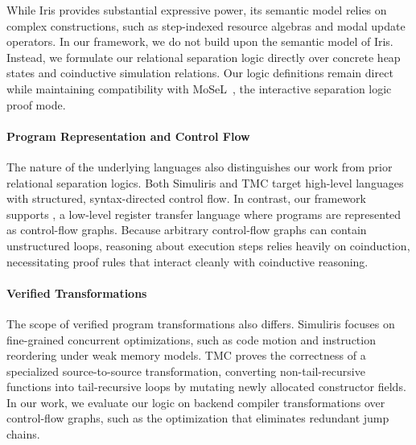 \documentclass[report.tex]{subfiles}
\begin{document}
While Iris provides substantial expressive power,
its semantic model relies on complex constructions,
such as step-indexed resource algebras and modal update operators.
In our framework,
we do not build upon the semantic model of Iris.
Instead,
we formulate our relational separation logic directly
over concrete heap states and coinductive simulation relations.
Our logic definitions remain direct while maintaining compatibility
with MoSeL~\parencite{krebbers-18-mosel},
the interactive separation logic proof mode.

\paragraph{Program Representation and Control Flow}
The nature of the underlying languages also distinguishes
our work from prior relational separation logics.
Both Simuliris and TMC target high-level languages
with structured,
syntax-directed control flow.
In contrast,
our framework supports \muRTL{},
a low-level register transfer language
where programs are represented as control-flow graphs.
Because arbitrary control-flow graphs can contain unstructured loops,
reasoning about execution steps relies heavily on coinduction,
necessitating proof rules that interact cleanly with coinductive reasoning.

\paragraph{Verified Transformations}
The scope of verified program transformations also differs.
Simuliris focuses on fine-grained concurrent optimizations,
such as code motion and instruction reordering under weak memory models.
TMC proves the correctness of a specialized source-to-source transformation,
converting non-tail-recursive functions into tail-recursive loops
by mutating newly allocated constructor fields.
In our work,
we evaluate our logic on backend compiler transformations
over control-flow graphs,
such as the optimization that eliminates redundant jump chains.
\end{document}
